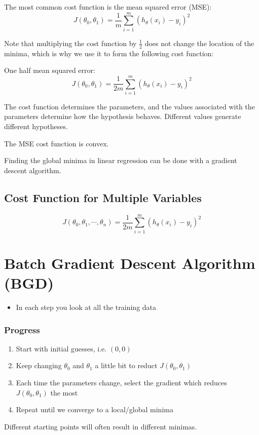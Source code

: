 The most common cost function is the mean squared error (MSE):
\[
    J(\theta_0, \theta_1) = \frac{1}{m}\sum_{i=1}^m\left(h_\theta(x_i)-y_i\right)^2
\]

Note that multiplying the cost function by $\frac{1}{2}$ does not change the location of the minima, which is why we use it to form the following cost function:
\bigskip

One half mean squared error:
\[
    J(\theta_0, \theta_1) = \frac{1}{2m}\sum_{i=1}^m\left(h_\theta(x_i)-y_i\right)^2
\]

The cost function determines the parameters, and the values associated with the parameters determine how the hypothesis behaves.
Different values generate different hypotheses.

The MSE cost function is convex.

Finding the global minima in linear regression can be done with a gradient descent algorithm.

\subsection{Cost Function for Multiple Variables}
\[
    J(\theta_0, \theta_1, \cdots, \theta_n) = \frac{1}{2m}\sum_{i=1}^m\left(h_\theta(x_i)-y_i\right)^2
\]

\section{Batch Gradient Descent Algorithm (BGD)}
\begin{itemize}
    \item In each step you look at all the training data
\end{itemize}

\subsubsection{Progress}
\begin{enumerate}
    \item Start with initial guesses, i.e. $(0, 0)$
    \item Keep changing $\theta_0$ and $\theta_1$ a little bit to reduct $J(\theta_0, \theta_1)$
    \item Each time the parameters change, select the gradient which reduces $J(\theta_0, \theta_1)$ the most
    \item Repeat until we converge to a local/global minima
\end{enumerate}
Different starting points will often result in different minimas.

